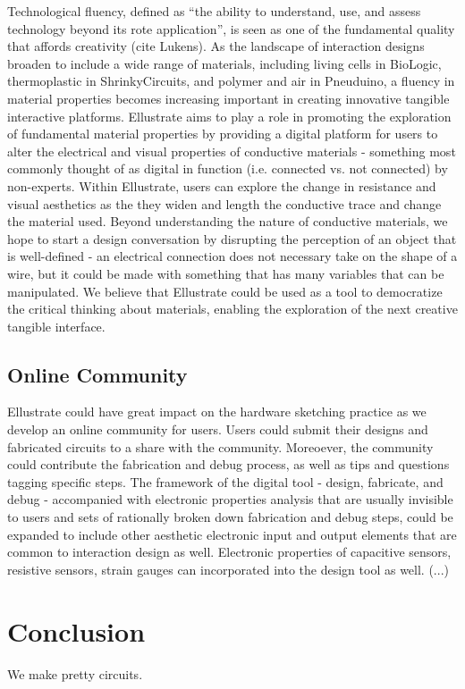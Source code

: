 \documentclass{sigchi}
\begin{document}
Technological fluency, defined as ``the ability to understand, use, and assess technology beyond its rote application'', is seen as one of the fundamental quality that affords creativity (cite Lukens). As the landscape of interaction designs broaden to include a wide range of materials, including living cells in BioLogic, thermoplastic in ShrinkyCircuits, and polymer and air in Pneuduino, a fluency in material properties becomes increasing important in creating innovative tangible interactive platforms. Ellustrate aims to play a role in promoting the exploration of fundamental material properties by providing a digital platform for users to alter the electrical and visual properties of conductive materials - something most commonly thought of as digital in function (i.e. connected vs. not connected) by non-experts. Within Ellustrate, users can explore the change in resistance and visual aesthetics as the they widen and length the conductive trace and change the material used. Beyond understanding the nature of conductive materials, we hope to start a design conversation by disrupting the perception of an object that is well-defined - an electrical connection does not necessary take on the shape of a wire, but it could be made with something that has many variables that can be manipulated. We believe that Ellustrate could be used as a tool to democratize the critical thinking about materials, enabling the exploration of the next creative tangible interface. 


\subsection{Online Community}
Ellustrate could have great impact on the hardware sketching practice as we develop an online community for users. Users could submit their designs and fabricated circuits to a share with the community. Moreoever, the community could contribute the fabrication and debug process, as well as tips and questions tagging specific steps. The framework of the digital tool - design, fabricate, and debug - accompanied with electronic properties analysis that are usually invisible to users and sets of rationally broken down fabrication and debug steps, could be expanded to include other aesthetic electronic input and output elements that are common to interaction design as well. Electronic properties of capacitive sensors, resistive sensors, strain gauges can incorporated into the design tool as well. (...)

\section {Conclusion}
We make pretty circuits.


\balance



\end{document}
